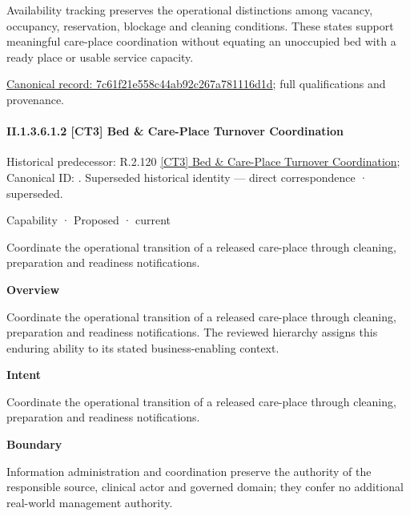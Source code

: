 Availability tracking preserves the operational distinctions among vacancy, occupancy, reservation, blockage and cleaning conditions. These states support meaningful care-place coordination without equating an unoccupied bed with a ready place or usable service capacity.


{\footnotesize \href{../../../../../../../continuum/strategy/capability/feature/7c61f21e558c44ab92c267a781116d1d.md}{Canonical record: 7c61f21e558c44ab92c267a781116d1d}; full qualifications and provenance.}\par
\paragraph*{II.1.3.6.1.2 [CT3] Bed \& Care-Place Turnover Coordination}
\label{navigation:II.1.3.6.1.2}

{\small Historical predecessor: R.2.120 \hyperref[element:a50662edda954bc58c44184d84591d5b]{[CT3] Bed \& Care-Place Turnover Coordination}; Canonical ID: \texttt{}. Superseded historical identity — direct correspondence · superseded.}\par
\label{element:3c9464f9eae1415d8fa041bd1f3da4f2}
{\small Capability · Proposed · current}\par

Coordinate the operational transition of a released care-place through cleaning, preparation and readiness notifications.



\textbf{Overview}



Coordinate the operational transition of a released care-place through cleaning, preparation and readiness notifications. The reviewed hierarchy assigns this enduring ability to its stated business-enabling context.



\textbf{Intent}



Coordinate the operational transition of a released care-place through cleaning, preparation and readiness notifications.



\textbf{Boundary}



Information administration and coordination preserve the authority of the responsible source, clinical actor and governed domain; they confer no additional real-world management authority.



